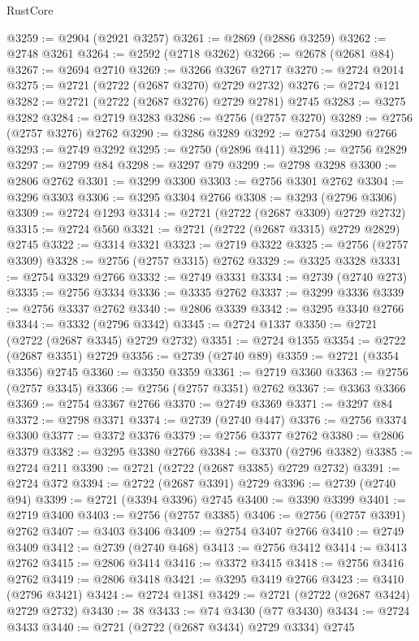 \begin{lexlean}{RustCore}
\begin{coremodule}
@3259 := @2904 (@2921 @3257)
@3261 := @2869 (@2886 @3259)
@3262 := @2748 @3261
@3264 := @2592 (@2718 @3262)
@3266 := @2678 (@2681 @84)
@3267 := @2694 @2710
@3269 := @3266 @3267 @2717
@3270 := @2724 @2014
@3275 := @2721 (@2722 (@2687 @3270) @2729 @2732)
@3276 := @2724 @121
@3282 := @2721 (@2722 (@2687 @3276) @2729 @2781) @2745
@3283 := @3275 @3282
@3284 := @2719 @3283
@3286 := @2756 (@2757 @3270)
@3289 := @2756 (@2757 @3276) @2762
@3290 := @3286 @3289
@3292 := @2754 @3290 @2766
@3293 := @2749 @3292
@3295 := @2750 (@2896 @411)
@3296 := @2756 @2829
@3297 := @2799 @84
@3298 := @3297 @79
@3299 := @2798 @3298
@3300 := @2806 @2762
@3301 := @3299 @3300
@3303 := @2756 @3301 @2762
@3304 := @3296 @3303
@3306 := @3295 @3304 @2766
@3308 := @3293 (@2796 @3306)
@3309 := @2724 @1293
@3314 := @2721 (@2722 (@2687 @3309) @2729 @2732)
@3315 := @2724 @560
@3321 := @2721 (@2722 (@2687 @3315) @2729 @2829) @2745
@3322 := @3314 @3321
@3323 := @2719 @3322
@3325 := @2756 (@2757 @3309)
@3328 := @2756 (@2757 @3315) @2762
@3329 := @3325 @3328
@3331 := @2754 @3329 @2766
@3332 := @2749 @3331
@3334 := @2739 (@2740 @273)
@3335 := @2756 @3334
@3336 := @3335 @2762
@3337 := @3299 @3336
@3339 := @2756 @3337 @2762
@3340 := @2806 @3339
@3342 := @3295 @3340 @2766
@3344 := @3332 (@2796 @3342)
@3345 := @2724 @1337
@3350 := @2721 (@2722 (@2687 @3345) @2729 @2732)
@3351 := @2724 @1355
@3354 := @2722 (@2687 @3351) @2729
@3356 := @2739 (@2740 @89)
@3359 := @2721 (@3354 @3356) @2745
@3360 := @3350 @3359
@3361 := @2719 @3360
@3363 := @2756 (@2757 @3345)
@3366 := @2756 (@2757 @3351) @2762
@3367 := @3363 @3366
@3369 := @2754 @3367 @2766
@3370 := @2749 @3369
@3371 := @3297 @84
@3372 := @2798 @3371
@3374 := @2739 (@2740 @447)
@3376 := @2756 @3374 @3300
@3377 := @3372 @3376
@3379 := @2756 @3377 @2762
@3380 := @2806 @3379
@3382 := @3295 @3380 @2766
@3384 := @3370 (@2796 @3382)
@3385 := @2724 @211
@3390 := @2721 (@2722 (@2687 @3385) @2729 @2732)
@3391 := @2724 @372
@3394 := @2722 (@2687 @3391) @2729
@3396 := @2739 (@2740 @94)
@3399 := @2721 (@3394 @3396) @2745
@3400 := @3390 @3399
@3401 := @2719 @3400
@3403 := @2756 (@2757 @3385)
@3406 := @2756 (@2757 @3391) @2762
@3407 := @3403 @3406
@3409 := @2754 @3407 @2766
@3410 := @2749 @3409
@3412 := @2739 (@2740 @468)
@3413 := @2756 @3412
@3414 := @3413 @2762
@3415 := @2806 @3414
@3416 := @3372 @3415
@3418 := @2756 @3416 @2762
@3419 := @2806 @3418
@3421 := @3295 @3419 @2766
@3423 := @3410 (@2796 @3421)
@3424 := @2724 @1381
@3429 := @2721 (@2722 (@2687 @3424) @2729 @2732)
@3430 := 38
@3433 := @74 @3430 (@77 @3430)
@3434 := @2724 @3433
@3440 := @2721 (@2722 (@2687 @3434) @2729 @3334) @2745

\end{coremodule}
\end{lexlean}
